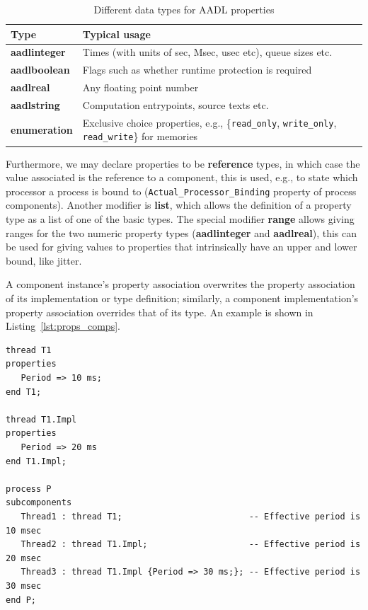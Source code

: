\begin{table}
\centering
\begin{tabular}{|l|l|}
\hline
\textbf{Type} & \textbf{Typical usage} \\
\hline
\textbf{aadlinteger} & Times (with units of sec, Msec, usec etc), queue sizes etc. \\
\textbf{aadlboolean} & Flags such as whether runtime protection is required \\
\textbf{aadlreal} & Any floating point number\\
\textbf{aadlstring} & Computation entrypoints, source texts etc.\\
\textbf{enumeration} & Exclusive choice properties, e.g., \{\texttt{read\_only},
\texttt{write\_only}, \texttt{read\_write}\} for memories\\
\hline
\end{tabular}
\caption{Different data types for AADL properties}
\label{tab:prop_types}
\end{table}

Furthermore, we may declare properties to be \textbf{reference} types,
in which case the value associated is the reference to a component,
this is used, e.g., to state which processor a process is bound to
(\texttt{Actual\_Processor\_Binding} property of process
components). Another modifier is \textbf{list}, which allows the
definition of a property type as a list of one of the basic types. The
special modifier \textbf{range} allows giving ranges for the two
numeric property types (\textbf{aadlinteger} and \textbf{aadlreal}),
this can be used for giving values to properties that intrinsically
have an upper and lower bound, like jitter.

A component instance's property association overwrites the property
association of its implementation or type definition; similarly, a
component implementation's property association overrides that of its
type. An example is shown in Listing~\ref{lst:props_comps}.

\begin{minipage}{\listingwidth}
\lstset{language=aadl,
  numbers=left,
  numberstyle=\tiny
}
\begin{lstlisting}[label=lst:props_comps, caption=Property definition
    example for components with property override semantics shown.]
thread T1
properties
   Period => 10 ms;
end T1;

thread T1.Impl
properties
   Period => 20 ms
end T1.Impl;

process P
subcomponents
   Thread1 : thread T1;                         -- Effective period is 10 msec
   Thread2 : thread T1.Impl;                    -- Effective period is 20 msec
   Thread3 : thread T1.Impl {Period => 30 ms;}; -- Effective period is 30 msec
end P;
\end{lstlisting}
\end{minipage}

